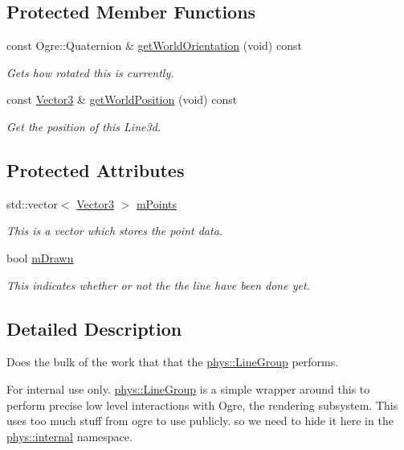 \subsection*{Protected Member Functions}
\begin{DoxyCompactItemize}
\item 
const Ogre::Quaternion \& \hyperlink{classphys_1_1internal_1_1Line3D_a68aea39fc0eee3eeb744c5cd151ef209}{getWorldOrientation} (void) const 
\begin{DoxyCompactList}\small\item\em Gets how rotated this is currently. \item\end{DoxyCompactList}\item 
const \hyperlink{classphys_1_1Vector3}{Vector3} \& \hyperlink{classphys_1_1internal_1_1Line3D_a5bf47edcb7d369718c40c56d9db11b29}{getWorldPosition} (void) const 
\begin{DoxyCompactList}\small\item\em Get the position of this Line3d. \item\end{DoxyCompactList}\end{DoxyCompactItemize}
\subsection*{Protected Attributes}
\begin{DoxyCompactItemize}
\item 
std::vector$<$ \hyperlink{classphys_1_1Vector3}{Vector3} $>$ \hyperlink{classphys_1_1internal_1_1Line3D_acb6b813e2d713dbad02fe5a5ca1af97e}{mPoints}
\begin{DoxyCompactList}\small\item\em This is a vector which stores the point data. \item\end{DoxyCompactList}\item 
bool \hyperlink{classphys_1_1internal_1_1Line3D_a7f3a190db3c0cd83ff4fdf3d95d6f0ee}{mDrawn}
\begin{DoxyCompactList}\small\item\em This indicates whether or not the the line have been done yet. \item\end{DoxyCompactList}\end{DoxyCompactItemize}


\subsection{Detailed Description}
Does the bulk of the work that that the \hyperlink{classphys_1_1LineGroup}{phys::LineGroup} performs. \begin{DoxyInternal}{For internal use only.}
\hyperlink{classphys_1_1LineGroup}{phys::LineGroup} is a simple wrapper around this to perform precise low level interactions with Ogre, the rendering subsystem. This uses too much stuff from ogre to use publicly. so we need to hide it here in the \hyperlink{namespacephys_1_1internal}{phys::internal} namespace. \end{DoxyInternal}


